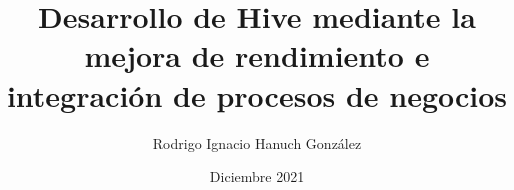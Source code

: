 \documentclass[pdftex,spanish]{pucthesis}	%
\begin{document}

\title[Desarrollo de Hive mediante la mejora de rendimiento e integración de procesos de negocios]
   {\bf Desarrollo de Hive mediante la mejora de rendimiento e integración de procesos de negocios}       
\author[Rodrigo Ignacio Hanuch González]{Rodrigo Ignacio Hanuch González}

\address{Escuela de Ingenier\'ia\\
                   Pontificia Universidad Cat\'olica de Chile\\ 
                   Vicu\~na Mackenna 4860\\
                  Santiago, Chile\\
                  {\it Tel.\/} : 56 (2) 354-2000}

\ogrsmember                 {}
\subject                            {Structural Engineering}
\date                                 {Diciembre 2021}
\dedication                      {Dedicado a mis padres y hermana, quienes me apoyaron, y toleraron, incondicionalmente durante mis estudios.}


\NoChapterPageNumber
{}
\maketitle

\end{document}
